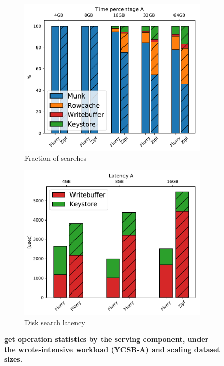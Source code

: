 \begin{figure}
\centering
\hspace{0.05\linewidth}
\begin{subfigure}{0.3\linewidth}
\includegraphics[width=\textwidth]{figs/Time_percentage_A.pdf}
\caption{Fraction of searches}
\label{fig:readstat:dist}
\end{subfigure}
\hspace{0.05\linewidth}
\begin{subfigure}{0.3\linewidth}
\includegraphics[width=\textwidth]{figs/Latency_A.pdf}
\caption{Disk search latency}
\label{fig:readstat:lat}
\end{subfigure}
\caption{\bf{\sys\/ get operation statistics by the serving component, under the wrote-intensive workload (YCSB-A) and scaling dataset sizes.}}
\label{fig:readstat}
\end{figure}

